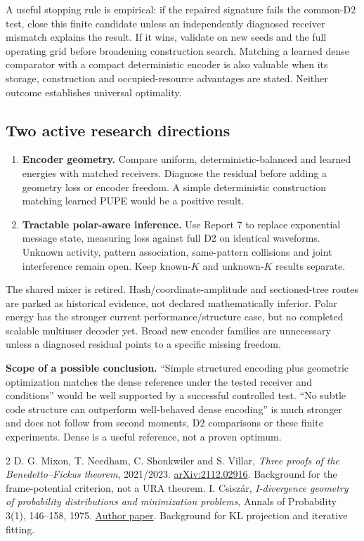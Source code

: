 \documentclass[10pt,a4paper]{article}
\begin{document}
A useful stopping rule is empirical: if the repaired signature fails the common-D2 test, close this
finite candidate unless an independently diagnosed receiver mismatch explains the result. If it wins,
validate on new seeds and the full operating grid before broadening construction search. Matching a
learned dense comparator with a compact deterministic encoder is also valuable when its storage,
construction and occupied-resource advantages are stated. Neither outcome establishes universal optimality.

\subsection{Two active research directions}
\begin{enumerate}
\item \textbf{Encoder geometry.} Compare uniform, deterministic-balanced and learned energies with matched receivers.
      Diagnose the residual before adding a geometry loss or encoder freedom. A simple deterministic construction
      matching learned PUPE would be a positive result.
\item \textbf{Tractable polar-aware inference.} Use Report 7 to replace exponential message state, measuring loss
      against full D2 on identical waveforms. Unknown activity, pattern association, same-pattern collisions and joint
      interference remain open. Keep known-$K$ and unknown-$K$ results separate.
\end{enumerate}
The shared mixer is retired. Hash/coordinate-amplitude and sectioned-tree routes are parked as historical evidence,
not declared mathematically inferior. Polar energy has the stronger current performance/structure case, but no
completed scalable multiuser decoder yet. Broad new encoder families are unnecessary unless a diagnosed residual
points to a specific missing freedom.

\textbf{Scope of a possible conclusion.} ``Simple structured encoding plus geometric optimization matches the dense
reference under the tested receiver and conditions'' would be well supported by a successful controlled test.
``No subtle code structure can outperform well-behaved dense encoding'' is much stronger and does not follow from
second moments, D2 comparisons or these finite experiments. Dense is a useful reference, not a proven optimum.

\begin{thebibliography}{2}
 D. G. Mixon, T. Needham, C. Shonkwiler and S. Villar,
\emph{Three proofs of the Benedetto--Fickus theorem}, 2021/2023.
\href{https://arxiv.org/abs/2112.02916}{arXiv:2112.02916}. Background for the frame-potential criterion, not a URA theorem.
 I. Csisz\'ar, \emph{I-divergence geometry of probability distributions and minimization problems},
Annals of Probability 3(1), 146--158, 1975.
\href{https://web.mit.edu/6.291/www/handouts/csiszar_Idiv.pdf}{Author paper}. Background for KL projection and iterative fitting.
\end{thebibliography}
\end{document}
